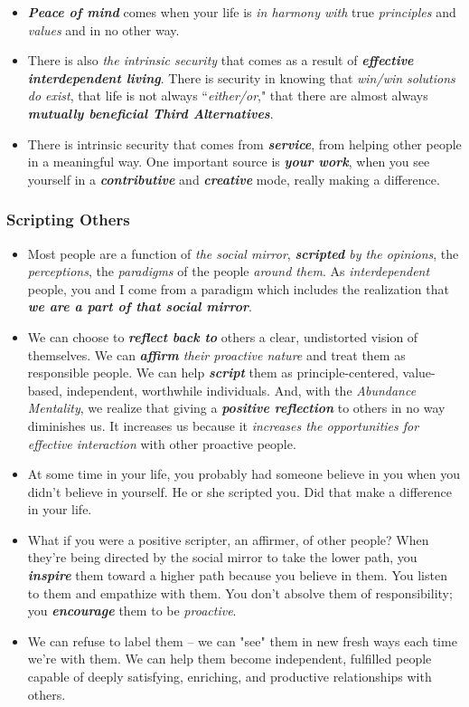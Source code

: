 \documentclass[11pt]{article}
\begin{document}
\begin{itemize}
\item \emph{\textbf{Peace of mind}} comes when your life is \emph{in harmony with} true \emph{principles} and \emph{values} and in no other way.

\item There is also \emph{the intrinsic security} that comes as a result of \emph{\textbf{effective interdependent living}}. There is security in knowing that \emph{win/win solutions do exist}, that life is not always ``\emph{either/or}," that there are almost always \emph{\textbf{mutually beneficial Third Alternatives}}. 

\item There is intrinsic security that comes from \emph{\textbf{service}}, from helping other people in a meaningful way. One important source is \emph{\textbf{your work}}, when you see yourself in a \emph{\textbf{contributive}} and \emph{\textbf{creative}} mode, really making a difference. 
\end{itemize}
\subsubsection{Scripting Others}
\begin{itemize}
\item Most people are a function of \emph{the social mirror}, \emph{\textbf{scripted} by the opinions}, the \emph{perceptions}, the \emph{paradigms} of the people \emph{around them}. As \emph{interdependent} people, you and I come from a paradigm which includes the realization that \emph{\textbf{we are a part of that social mirror}}.

\item We can choose to \emph{\textbf{reflect back to}} others a clear, undistorted vision of themselves. We can \emph{\textbf{affirm} their proactive nature} and treat them as responsible people. We can help \emph{\textbf{script}} them as principle-centered, value-based, independent, worthwhile individuals. And, with the \emph{Abundance Mentality}, we realize that giving a \emph{\textbf{positive reflection}} to others in no way diminishes us. It increases us because it \emph{increases the opportunities for effective interaction} with other proactive people.

\item At some time in your life, you probably had someone believe in you when you didn't believe in yourself. He or she scripted you. Did that make a difference in your life.

\item What if you were a positive scripter, an affirmer, of other people? When they're being directed by the social mirror to take the lower path, you \emph{\textbf{inspire}} them toward a higher path because you believe in them. You listen to them and empathize with them. You don't absolve them of responsibility; you \emph{\textbf{encourage}} them to be \emph{proactive}.

\item We can refuse to label them -- we can "see" them in new fresh ways each time we're with them. We can help them become independent, fulfilled people capable of deeply satisfying, enriching, and productive relationships with others.
\end{itemize}
\end{document}
